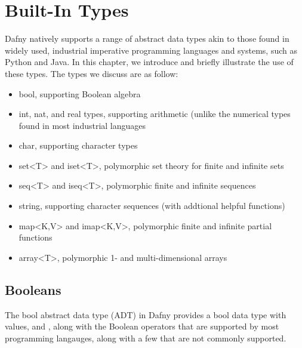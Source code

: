 \documentclass[letterpaper,10pt,english]{sphinxmanual}
\begin{document}
\section{Built-In Types}
\label{\detokenize{06-dafny-language:built-in-types}}
Dafny natively supports a range of abstract data types akin to those
found in widely used, industrial imperative programming languages and
systems, such as Python and Java. In this chapter, we introduce and
briefly illustrate the use of these types. The types we discuss are
as follow:
\begin{itemize}
\item {} 
bool, supporting Boolean algebra

\item {} 
int, nat, and real types, supporting  arithmetic (unlike
the numerical types found in most industrial languages

\item {} 
char, supporting character types

\item {} 
set\textless{}T\textgreater{} and iset\textless{}T\textgreater{}, polymorphic set theory for finite and infinite sets

\item {} 
seq\textless{}T\textgreater{} and iseq\textless{}T\textgreater{}, polymorphic finite and infinite sequences

\item {} 
string, supporting character sequences (with addtional helpful functions)

\item {} 
map\textless{}K,V\textgreater{} and imap\textless{}K,V\textgreater{}, polymorphic finite and infinite partial functions

\item {} 
array\textless{}T\textgreater{}, polymorphic 1- and multi-dimensional arrays

\end{itemize}


\subsection{Booleans}
\label{\detokenize{06-dafny-language:booleans}}
The bool abstract data type (ADT) in Dafny provides a bool data type
with values,  and , along with the Boolean operators that
are supported by most programming langauges, along with a few that are
not commonly supported.
\end{document}
